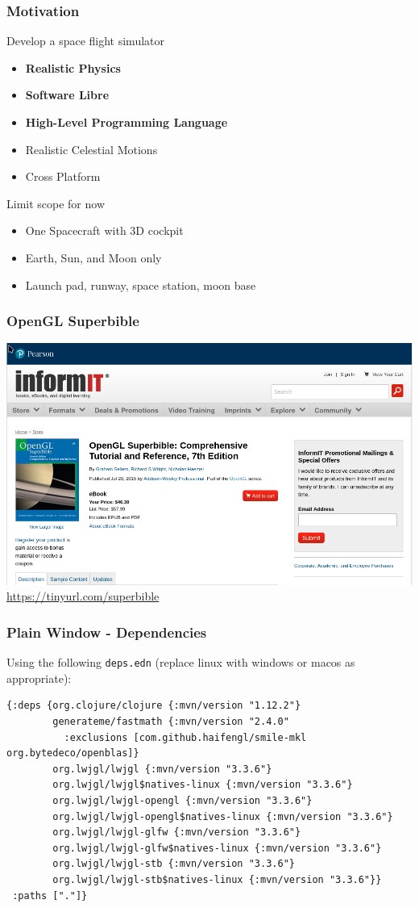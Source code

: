 \documentclass[aspectratio=169,11pt,xcolor=dvipsnames]{beamer}
\begin{document}
\begin{frame}
  \frametitle{Motivation}
  \begin{minipage}[t]{0.49\textwidth}
    Develop a space flight simulator
    \begin{itemize}
      \item \textbf{Realistic Physics}
      \item \textbf{Software Libre}
      \item \textbf{High-Level Programming Language}
      \item Realistic Celestial Motions
      \item Cross Platform
    \end{itemize}
  \end{minipage}
  \begin{minipage}[t]{0.49\textwidth}
    Limit scope for now
    \begin{itemize}
      \item One Spacecraft with 3D cockpit
      \item Earth, Sun, and Moon only
      \item Launch pad, runway, space station, moon base
    \end{itemize}
  \end{minipage}
\end{frame}

\begin{frame}
  \frametitle{OpenGL Superbible}
  \begin{center}
    \includegraphics[width=.35\textwidth]{superbible}\\
    \url{https://tinyurl.com/superbible}
  \end{center}
\end{frame}

\begin{frame}[fragile]
  \frametitle{Plain Window {-} Dependencies}
  Using the following \texttt{deps.edn} (replace linux with windows or macos as appropriate):
  \begin{verbatim}
{:deps {org.clojure/clojure {:mvn/version "1.12.2"}
        generateme/fastmath {:mvn/version "2.4.0"
          :exclusions [com.github.haifengl/smile-mkl org.bytedeco/openblas]}
        org.lwjgl/lwjgl {:mvn/version "3.3.6"}
        org.lwjgl/lwjgl$natives-linux {:mvn/version "3.3.6"}
        org.lwjgl/lwjgl-opengl {:mvn/version "3.3.6"}
        org.lwjgl/lwjgl-opengl$natives-linux {:mvn/version "3.3.6"}
        org.lwjgl/lwjgl-glfw {:mvn/version "3.3.6"}
        org.lwjgl/lwjgl-glfw$natives-linux {:mvn/version "3.3.6"}
        org.lwjgl/lwjgl-stb {:mvn/version "3.3.6"}
        org.lwjgl/lwjgl-stb$natives-linux {:mvn/version "3.3.6"}}
 :paths ["."]}
  \end{verbatim}
\end{frame}
\end{document}
